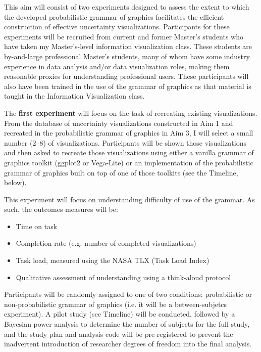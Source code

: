 \documentclass[11pt]{article}
\begin{document}
\vspace{-1.0em}
\noindent\hrulefill

This aim will consist of two experiments designed to assess the extent to which the developed probabilistic grammar of graphics facilitates the efficient construction of effective uncertainty visualizations. Participants for these experiments will be recruited from current and former Master's students who have taken my Master's-level information visualization class. These students are by-and-large professional Master's students, many of whom have some industry experience in data analysis and/or data visualization roles, making them reasonable proxies for understanding professional users. These participants will also have been trained in the use of the grammar of graphics as that material is taught in the Information Visualization class.

The \textbf{first experiment} will focus on the task of recreating existing visualizations. From the database of uncertainty visualizations constructed in Aim 1 and recreated in the probabilistic grammar of graphics in Aim 3, I will select a small number (2--8) of visualizations. Participants will be shown those visualizations and then asked to recreate those visualizations using either a vanilla grammar of graphics toolkit (ggplot2 or Vega-Lite) or an implementation of the probabilistic grammar of graphics built on top of one of those toolkits (see the Timeline, below). 

This experiment will focus on understanding difficulty of use of the grammar. As such, the outcomes measures will be:

\vspace{-0.75em}
\begin{itemize}[noitemsep]
  \item Time on task
  \item Completion rate (e.g. number of completed visualizations)
  \item Task load, measured using the NASA TLX (Task Load Index) \cite{hart1988development}
  \item Qualitative assessment of understanding using a think-aloud protocol
\end{itemize}

Participants will be randomly assigned to one of two conditions: probabilistic or non-probabilistic grammar of graphics (i.e. it will be a between-subjetcs experiment). A pilot study (see Timeline) will be conducted, followed by a Bayesian power analysis \cite{Kruschke2016bayesnew} to determine the number of subjects for the full study, and the study plan and analysis code will be pre-registered to prevent the inadvertent introduction of researcher degrees of freedom into the final analysis.
\end{document}
